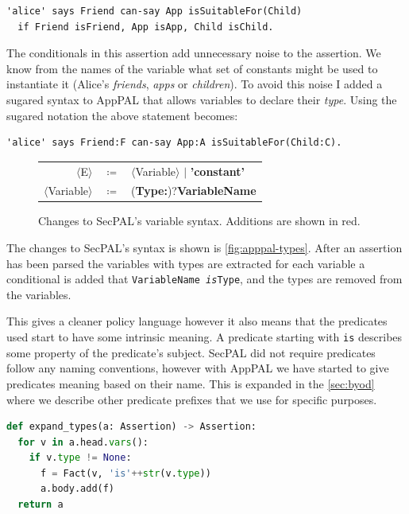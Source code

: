 \documentclass[a4paper]{scrartcl}
\newcommand{\new}[1]{{\color{BrickRed}#1}}
\begin{document}
\begin{lstlisting}
'alice' says Friend can-say App isSuitableFor(Child)
  if Friend isFriend, App isApp, Child isChild.
\end{lstlisting}

The conditionals in this assertion add unnecessary noise to the assertion. We
know from the names of the variable what set of constants might be used
to instantiate it (Alice's \emph{friends}, \emph{apps} or \emph{children}). To
avoid this noise I added a sugared syntax to AppPAL that allows variables to
declare their \emph{type}. Using the sugared notation the above statement
becomes:

\begin{lstlisting}
'alice' says Friend:F can-say App:A isSuitableFor(Child:C).
\end{lstlisting}

\begin{figure}
  \newcommand{\nonterminal}[1]{$\langle$#1$\rangle$}
  \newcommand{\terminal}[1]{\textbf{#1}}
  \begin{tabular}{r c l}
    \footnotesize
    \nonterminal{E}         & $\coloneqq$ & \nonterminal{Variable} $\vert$ \terminal{'constant'} \\
    \nonterminal{Variable}  & $\coloneqq$ & \new{(\terminal{Type}\terminal{:})?}\terminal{VariableName}
  \end{tabular}
  \caption{Changes to SecPAL's variable syntax.  Additions are shown in \new{red}.}
  \label{fig:apppal-types}
\end{figure}
The changes to SecPAL's syntax is shown is \autoref{fig:apppal-types}.
After an assertion has been parsed the variables with types are extracted for
each variable a conditional is added that \texttt{VariableName \emph{is}Type},
and the types are removed from the variables.

This gives a cleaner policy language however it also means that the predicates
used start to have some intrinsic meaning.  A predicate starting with
\texttt{is} describes some property of the predicate's subject.
SecPAL did not require predicates follow any naming conventions, however with
AppPAL we have started to give predicates meaning based on their name.
This is expanded in the \autoref{sec:byod} where we describe other predicate
prefixes that we use for specific purposes.


\begin{lstlisting}[language=Python, float, caption={Procedure used to expand types from AppPAL into SecPAL.}]
def expand_types(a: Assertion) -> Assertion:
  for v in a.head.vars():
    if v.type != None:
      f = Fact(v, 'is'++str(v.type))
      a.body.add(f)
  return a
\end{lstlisting}
\end{document}
